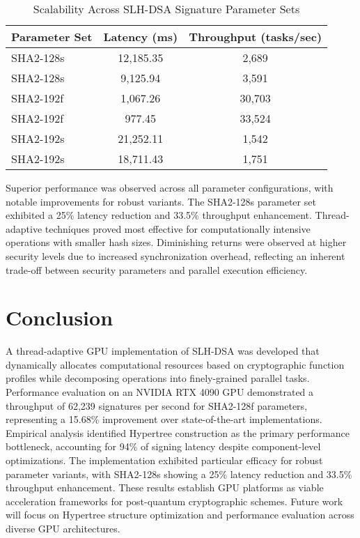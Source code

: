 \documentclass[journal]{IEEEtran}
\begin{document}
\begin{table}[h]
  \centering
  \caption{Scalability Across SLH-DSA Signature Parameter Sets}
  \label{tab:scalability}
  \begin{tabular}{@{}lcc@{}}
    \toprule
    \textbf{Parameter Set} & \textbf{Latency (ms)} & \textbf{Throughput (tasks/sec)} \\
    \midrule
    SHA2-128s \cite{Wang2025} & 12,185.35 & 2,689 \\
    SHA2-128s & 9,125.94 & 3,591 \\
    \midrule
    SHA2-192f \cite{Wang2025} & 1,067.26 & 30,703 \\
    SHA2-192f & 977.45 & 33,524 \\
    \midrule
    SHA2-192s \cite{Wang2025} & 21,252.11 & 1,542 \\
    SHA2-192s & 18,711.43 & 1,751 \\
    \bottomrule
  \end{tabular}
\end{table}

Superior performance was observed across all parameter configurations, with notable improvements for robust variants. The SHA2-128s parameter set exhibited a 25\% latency reduction and 33.5\% throughput enhancement. Thread-adaptive techniques proved most effective for computationally intensive operations with smaller hash sizes. Diminishing returns were observed at higher security levels due to increased synchronization overhead, reflecting an inherent trade-off between security parameters and parallel execution efficiency.

\section{Conclusion}\label{sec:conclusion}

A thread-adaptive GPU implementation of SLH-DSA was developed that dynamically allocates computational resources based on cryptographic function profiles while decomposing operations into finely-grained parallel tasks. Performance evaluation on an NVIDIA RTX 4090 GPU demonstrated a throughput of 62,239 signatures per second for SHA2-128f parameters, representing a 15.68\% improvement over state-of-the-art implementations. Empirical analysis identified Hypertree construction as the primary performance bottleneck, accounting for 94\% of signing latency despite component-level optimizations. The implementation exhibited particular efficacy for robust parameter variants, with SHA2-128s showing a 25\% latency reduction and 33.5\% throughput enhancement. These results establish GPU platforms as viable acceleration frameworks for post-quantum cryptographic schemes. Future work will focus on Hypertree structure optimization and performance evaluation across diverse GPU architectures.
\end{document}
